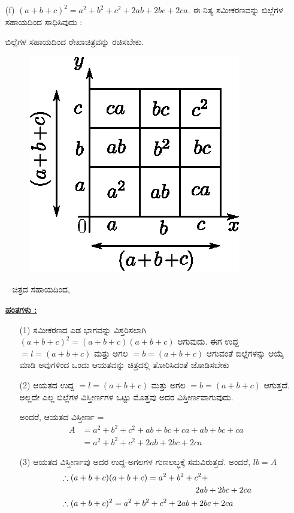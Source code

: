 \begin{enumerate}
\item[(f)] $(a+b+c)^2 = a^2 + b^2 + c^2 + 2ab + 2bc + 2ca.$ ಈ ನಿತ್ಯ ಸಮೀಕರಣವನ್ನು ಬಿಲ್ಲೆಗಳ ಸಹಾಯದಿಂದ ಸಾಧಿಸಿವುದು :

ಬಿಲ್ಲೆಗಳ ಸಹಾಯದಿಂದ ರೇಖಾಚಿತ್ರವನ್ನು ರಚಿಸಬೇಕು.
\begin{figure}[H]
\centering
\includegraphics[scale=0.8]{src/figure/chap3/fig3-32f.eps}
\end{figure}
~
\vskip -0.5cm
ಚಿತ್ರದ ಸಹಾಯದಿಂದ,


\noindent
{\textbf{\underline{ಹಂತಗಳು :}}}
\begin{itemize}
\item[(1)] ಸಮೀಕರಣದ ಎಡ ಭಾಗವನ್ನು ವಿಸ್ತರಿಸಲಾಗಿ $(a+b+c)^2 = (a+b+c)(a+b+c)$ ಆಗುವುದು. ಈಗ ಉದ್ದ $= l = (a+b+c)$ ಮತ್ತು ಅಗಲ $= b = (a+b+c)$ ಆಗುವಂತೆ ಬಿಲ್ಲೆಗಳನ್ನು ಆಯ್ಕೆ ಮಾಡಿ ಅವುಗಳಿಂದ ಒಂದು ಆಯತವನ್ನು ಚಿತ್ರದಲ್ಲಿ ತೋರಿಸಿದಂತೆ ಜೋಡಿಸಬೇಕು
\item[(2)] ಆಯತದ ಉದ್ದ $= l = (a+b+c)$ ಮತ್ತು ಅಗಲ $= b = (a+b+c)$ ಆಗುತ್ತದೆ. ಅಲ್ಲದೇ ಎಲ್ಲ ಬಿಲ್ಲೆಗಳ ವಿಸ್ತೀರ್ಣಗಳ ಒಟ್ಟು ಮೊತ್ತವು ಅದರ ವಿಸ್ತೀರ್ಣವಾಗುವುದು. 

ಅಂದರೆ, ಆಯತದ ವಿಸ್ತೀರ್ಣ =
\begin{align*}
A & = a^2 + b^2 + c^2 + ab + bc + ca + ab + bc + ca\\
& = a^2 + b^2 + c^2 + 2ab + 2bc + 2ca
\end{align*}

\item[(3)] ಆಯತದ ವಿಸ್ತೀರ್ಣವು ಅದರ ಉದ್ದ-ಅಗಲಗಳ ಗುಣಲಬ್ಧಕ್ಕೆ ಸಮವಿರುತ್ತದೆ. 
ಅಂದರೆ, $lb = A$
\begin{align*}
& \therefore (a+b+c)(a+b+c) = a^2 + b^2 + c^2 +\\
& \hspace{5.7cm} 2ab + 2bc + 2ca\\
& \therefore (a + b + c)^2 = a^2 + b^2 + c^2 + 2ab + 2bc + 2ca
\end{align*}


\end{itemize}
\end{enumerate}
